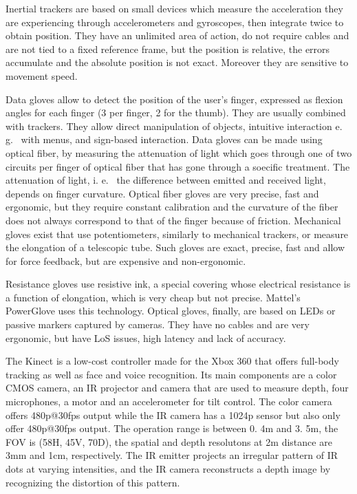 \documentclass[a4paper]{article}
\begin{document}
Inertial trackers are based on small devices which measure the
acceleration they are experiencing through accelerometers and
gyroscopes, then integrate twice to obtain position.
They have an
unlimited area of action, do not require cables and are not tied to a
fixed reference frame, but the position is relative, the errors
accumulate and the absolute position is not exact.
Moreover they are
sensitive to movement speed.

Data gloves allow to detect the position of the user's finger, expressed
as flexion angles for each finger (3 per finger, 2 for the thumb).
They
are usually combined with trackers.
They allow direct manipulation of
objects, intuitive interaction e.
g.
~with menus, and sign-based
interaction.
Data gloves can be made using optical fiber, by measuring
the attenuation of light which goes through one of two circuits per
finger of optical fiber that has gone through a soecific treatment.
The
attenuation of light, i.
e.
~the difference between emitted and received
light, depends on finger curvature.
Optical fiber gloves are very
precise, fast and ergonomic, but they require constant calibration and
the curvature of the fiber does not always correspond to that of the
finger because of friction.
Mechanical gloves exist that use
potentiometers, similarly to mechanical trackers, or measure the
elongation of a telescopic tube.
Such gloves are exact, precise, fast
and allow for force feedback, but are expensive and non-ergonomic.

Resistance gloves use resistive ink, a special covering whose electrical
resistance is a function of elongation, which is very cheap but not
precise.
Mattel's PowerGlove uses this technology.
Optical gloves,
finally, are based on LEDs or passive markers captured by cameras.
They
have no cables and are very ergonomic, but have LoS issues, high latency
and lack of accuracy.

The Kinect is a low-cost controller made for the Xbox 360 that offers
full-body tracking as well as face and voice recognition.
Its main
components are a color CMOS camera, an IR projector and camera that are
used to measure depth, four microphones, a motor and an accelerometer
for tilt control.
The color camera offers 480p@30fps output while the IR
camera has a 1024p sensor but also only offer 480p@30fps output.
The
operation range is between 0.
4m and 3.
5m, the FOV is (58H, 45V, 70D),
the spatial and depth resolutons at 2m distance are 3mm and 1cm,
respectively.
The IR emitter projects an irregular pattern of IR dots at
varying intensities, and the IR camera reconstructs a depth image by
recognizing the distortion of this pattern.
\end{document}

